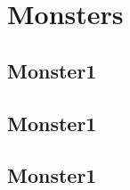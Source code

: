 \clearpage
\section{Monsters}
\lipsum[1]
\subsection{Monster1}
\lipsum[2]
\subsection{Monster1}
\lipsum[2]
\subsection{Monster1}
\lipsum[2]